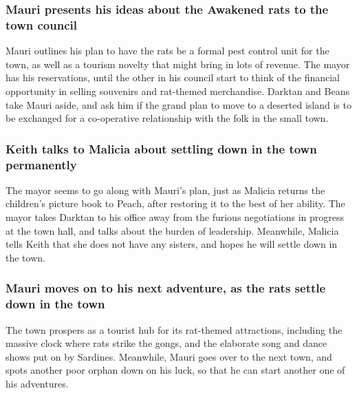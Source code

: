 \subsubsection{\Gls{Mauri} presents his ideas about the Awakened rats to the town council}
\Gls{Mauri} outlines his plan to have the rats be a formal pest control unit for the town, as well
as a tourism novelty that might bring in lots of revenue. The mayor has his reservations, until the
other in his council start to think of the financial opportunity in selling souvenirs and rat-themed
merchandise. \Gls{Darktan} and \Gls{Beans} take \Gls{Mauri} aside, and ask him if the grand plan to
move to a deserted island is to be exchanged for a co-operative relationship with the folk in the
small town.

\subsubsection{\Gls{Keith} talks to \Gls{Malicia} about settling down in the town permanently}
The mayor seems to go along with \Gls{Mauri}'s plan, just as \Gls{Malicia} returns the children's
picture book to \Gls{Peach}, after restoring it to the best of her ability. The mayor takes
\Gls{Darktan} to his office away from the furious negotiations in progress at the town hall, and
talks about the burden of leadership. Meanwhile, \Gls{Malicia} tells \Gls{Keith} that she does not
have any sisters, and hopes he will settle down in the town.

\subsubsection{\Gls{Mauri} moves on to his next adventure, as the rats settle down in the town}
The town prospers as a tourist hub for its rat-themed attractions, including the massive clock where
rats strike the gongs, and the elaborate song and dance shows put on by \Gls{Sardines}. Meanwhile,
\Gls{Mauri} goes over to the next town, and spots another poor orphan down on his luck, so that
he can start another one of his adventures.